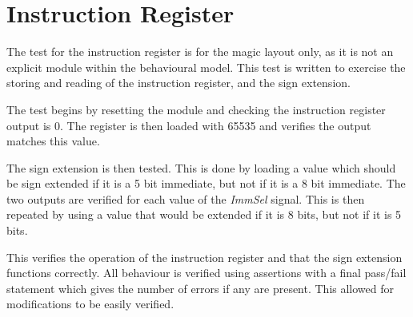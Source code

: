 
\section{Instruction Register}


The test for the instruction register is for the magic layout only, as it is not an explicit module within the behavioural model.
This test is written to exercise the storing and reading of the instruction register, and the sign extension.

The test begins by resetting the module and checking the instruction register output is 0. 
The register is then loaded with 65535 and verifies the output matches this value.

The sign extension is then tested. 
This is done by loading a value which should be sign extended if it is a 5 bit immediate, but not if it is a 8 bit immediate. 
The two outputs are verified for each value of the \textit{ImmSel} signal. 
This is then repeated by using a value that would be extended if it is 8 bits, but not if it is 5 bits. 

This verifies the operation of the instruction register and that the sign extension functions correctly. 
All behaviour is verified using assertions with a final pass/fail statement which gives the number of errors if any are present. 
This allowed for modifications to be easily verified. 

